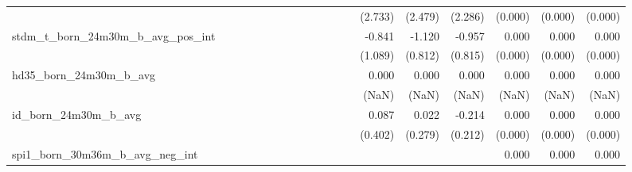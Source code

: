 \begin{tabular}{lrrrrrrrrrrrrrrrrrr}
                                            &              &              &              &              &              &              &              &              &               &              &              &               &      (2.733) &      (2.479) &       (2.286) &      (0.000) &      (0.000) &       (0.000) \\ 
stdm\_t\_born\_24m30m\_b\_avg\_pos\_int     &              &              &              &              &              &              &              &              &               &              &              &               &       -0.841 &       -1.120 &        -0.957 &        0.000 &        0.000 &         0.000 \\ 
                                            &              &              &              &              &              &              &              &              &               &              &              &               &      (1.089) &      (0.812) &       (0.815) &      (0.000) &      (0.000) &       (0.000) \\ 
hd35\_born\_24m30m\_b\_avg                  &              &              &              &              &              &              &              &              &               &              &              &               &        0.000 &        0.000 &         0.000 &        0.000 &        0.000 &         0.000 \\ 
                                            &              &              &              &              &              &              &              &              &               &              &              &               &        (NaN) &        (NaN) &         (NaN) &        (NaN) &        (NaN) &         (NaN) \\ 
id\_born\_24m30m\_b\_avg                    &              &              &              &              &              &              &              &              &               &              &              &               &        0.087 &        0.022 &        -0.214 &        0.000 &        0.000 &         0.000 \\ 
                                            &              &              &              &              &              &              &              &              &               &              &              &               &      (0.402) &      (0.279) &       (0.212) &      (0.000) &      (0.000) &       (0.000) \\ 
spi1\_born\_30m36m\_b\_avg\_neg\_int        &              &              &              &              &              &              &              &              &               &              &              &               &              &              &               &        0.000 &        0.000 &         0.000 \\ 

\end{tabular}
